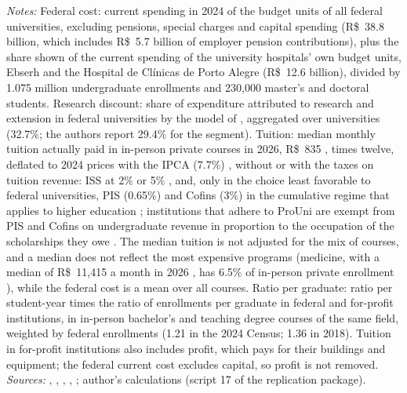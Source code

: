 \documentclass[11pt,a4paper]{article}
\begin{document}
\begin{table}[!htbp]
\begin{minipage}{\linewidth}
\textit{Notes:} Federal cost: current spending in 2024 of the budget units of all federal universities, excluding pensions, special charges and capital spending (R\$~38.8 billion, which includes R\$~5.7 billion of employer pension contributions), plus the share shown of the current spending of the university hospitals' own budget units, Ebserh and the Hospital de Cl\'inicas de Porto Alegre (R\$~12.6 billion), divided by 1.075 million undergraduate enrollments and 230,000 master's and doctoral students. Research discount: share of expenditure attributed to research and extension in federal universities by the model of \citet{bielschowsky2022}, aggregated over universities (32.7\%; the authors report 29.4\% for the segment). Tuition: median monthly tuition actually paid in in-person private courses in 2026, R\$~835 \citep{hoper2026}, times twelve, deflated to 2024 prices with the IPCA (7.7\%) \citep{ibgeipca}, without or with the taxes on tuition revenue: ISS at 2\% or 5\% \citep[arts.~8 and~8-A]{lc116}, and, only in the choice least favorable to federal universities, PIS (0.65\%) and Cofins (3\%) in the cumulative regime that applies to higher education \citep[art.~10, XIV]{lei10833}; institutions that adhere to ProUni are exempt from PIS and Cofins on undergraduate revenue in proportion to the occupation of the scholarships they owe \citep[art.~8]{lei11096}. The median tuition is not adjusted for the mix of courses, and a median does not reflect the most expensive programs (medicine, with a median of R\$~11,415 a month in 2026 \citep{hoper2026}, has 6.5\% of in-person private enrollment \citep{inepcenso}), while the federal cost is a mean over all courses. Ratio per graduate: ratio per student-year times the ratio of enrollments per graduate in federal and for-profit institutions, in in-person bachelor's and teaching degree courses of the same field, weighted by federal enrollments (1.21 in the 2024 Census; 1.36 in 2018). Tuition in for-profit institutions also includes profit, which pays for their buildings and equipment; the federal current cost excludes capital, so profit is not removed. \textit{Sources:} \citet{cgu2024}, \citet{inepcenso}, \citet{capes2024}, \citet{hoper2026}, \citet{ibgeipca}; author's calculations (script 17 of the replication package).
\end{minipage}
\end{table}
\end{document}
